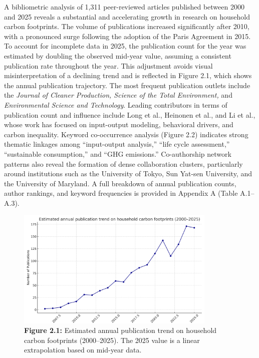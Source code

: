 \documentclass[12pt,a4paper]{article}%
\begin{document}
A bibliometric analysis of 1,311 peer-reviewed articles published between 2000 and 2025 reveals a substantial and accelerating growth in research on household carbon footprints. The volume of publications increased significantly after 2010, with a pronounced surge following the adoption of the Paris Agreement in 2015. To account for incomplete data in 2025, the publication count for the year was estimated by doubling the observed mid-year value, assuming a consistent publication rate throughout the year. This adjustment avoids visual misinterpretation of a declining trend and is reflected in Figure 2.1, which shows the annual publication trajectory. The most frequent publication outlets include the \textit{Journal of Cleaner Production, Science of the Total Environment,} and \textit{Environmental Science and Technology}. Leading contributors in terms of publication count and influence include Long et al., Heinonen et al., and Li et al., whose work has focused on input-output modeling, behavioral drivers, and carbon inequality. Keyword co-occurrence analysis (Figure 2.2) indicates strong thematic linkages among “input-output analysis,” “life cycle assessment,” “sustainable consumption,” and “GHG emissions.” Co-authorship network patterns also reveal the formation of dense collaboration clusters, particularly around institutions such as the University of Tokyo, Sun Yat-sen University, and the University of Maryland. A full breakdown of annual publication counts, author rankings, and keyword frequencies is provided in Appendix A (Table A.1–A.3).

\begin{figure}[htbp]
    \centering
    \includegraphics[width=0.85\textwidth]{publication_trend_darkblue_estimated2025.png}
    \caption*{\textbf{Figure 2.1: }Estimated annual publication trend on household carbon footprints (2000–2025). The 2025 value is a linear extrapolation based on mid-year data.}
\end{figure}
\end{document}
